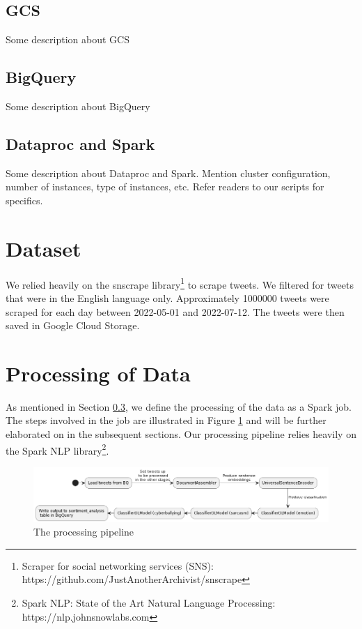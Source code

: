 \documentclass[a4paper,12pt]{article}
\begin{document}
\subsection{GCS}
Some description about GCS

\subsection{BigQuery}
Some description about BigQuery

\subsection{Dataproc and Spark}
\label{sec:spark}
Some description about Dataproc and Spark. Mention cluster configuration, number of instances, type of instances, etc. Refer readers to our scripts for specifics.

\section{Dataset}
\label{sec:dataset}
We relied heavily on the snscrape library\footnote{Scraper for social networking services (SNS): https://github.com/JustAnotherArchivist/snscrape} to scrape tweets. We filtered for tweets that were in the English language only. Approximately 1000000 tweets were scraped for each day between 2022-05-01 and 2022-07-12. The tweets were then saved in Google Cloud Storage.

\section{Processing of Data}

As mentioned in Section \ref{sec:spark}, we define the processing of the data as a Spark job. The steps involved in the job are illustrated in Figure \ref{fig:data-processing-pipeline} and will be further elaborated on in the subsequent sections. Our processing pipeline relies heavily on the Spark NLP library\footnote{Spark NLP: State of the Art Natural Language Processing: https://nlp.johnsnowlabs.com}.

\begin{figure}[h]
\centering
\includegraphics[width=\textwidth]{data-processing.png}
\caption{The processing pipeline}
\label{fig:data-processing-pipeline}
\end{figure}
\end{document}
